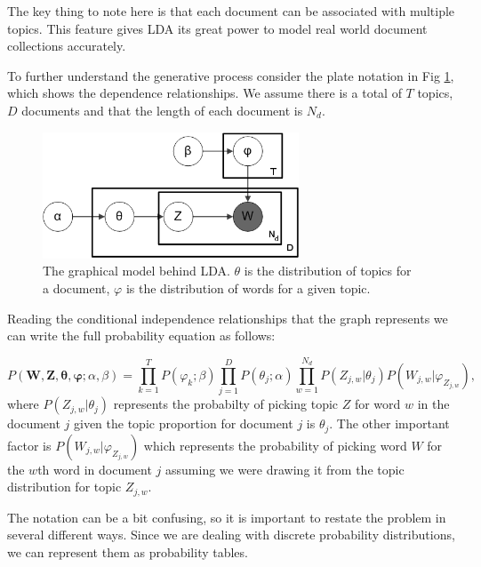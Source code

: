 \documentclass[11pt]{article}
\newcommand{\boldsymbol}[1]{\mathbf{#1}}
\begin{document}
    The key thing to note here is that each document can be associated with multiple topics.
    This feature gives LDA its great power to model real world document collections accurately.


    To further understand the generative process consider the plate notation in Fig \ref{fig:lda},
    which shows the dependence relationships. We assume there is a total of $T$ topics, $D$
    documents and that the length of each document is $N_d$.

    \begin{figure}[htb]
    \begin{center}
    \includegraphics[width=3in]{lda-diagram.png}  %
    \caption{ The graphical model behind LDA. $\theta$ is the distribution  of topics for a document,
              $\varphi$ is the distribution of words for a given topic.}
    \label{fig:lda}
    \end{center}
    \end{figure}


    Reading the conditional independence relationships that the graph represents we can write
    the full probability equation as follows:

    \begin{equation}
        P(\boldsymbol{W}, \boldsymbol{Z}, \boldsymbol{\theta}, \boldsymbol{\varphi};\alpha,\beta) = 
        \prod_{k=1}^T P(\varphi_k;\beta) 
            \prod_{j=1}^D P(\theta_j;\alpha) 
                \prod_{w=1}^{N_d} P(Z_{j,w}|\theta_j)P(W_{j,w}|\varphi_{Z_{j,w}}) ,
    \end{equation}
    where $P(Z_{j,w}|\theta_j)$ represents the probabilty of picking topic $Z$ for word $w$
    in the document $j$ given the topic proportion for document $j$ is $\theta_j$.
    The other important factor is $P(W_{j,w}|\varphi_{Z_{j,w}})$ which represents the 
    probability of picking word $W$ for the $w$th word in document $j$ assuming we were 
    drawing it from the topic distribution for topic $Z_{j,w}$.

    The notation can be a bit confusing, so it is important to restate the problem in several
    different ways. Since we are dealing with discrete probability distributions, we can 
    represent them as probability tables.
\end{document}
